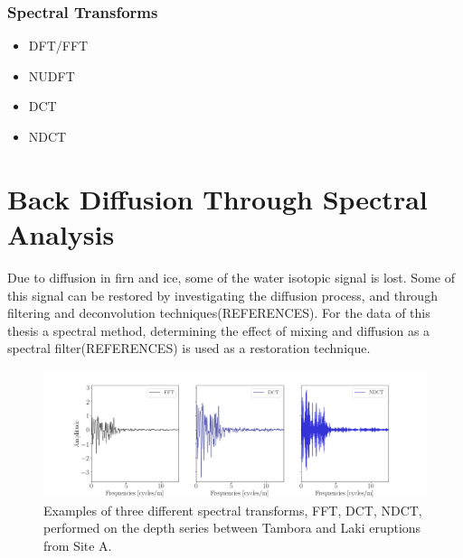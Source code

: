 \documentclass[../../CompleteThesis2/Complete_2ndDraft]{subfiles}
\begin{document}
\subsubsection[Spectral Transforms][Spectral Transforms]{Spectral Transforms}
\label{Subsubsec:SignalAnalysis_BackDiffusion_SpectralAnalysis_SpectralTransforms}

\begin{itemize}
	\item DFT/FFT
	\item NUDFT
	\item DCT
	\item NDCT
\end{itemize}




\section[Back Diffusion][Back Diffusion]{Back Diffusion Through Spectral Analysis}
\label{Sec:SignalAnalysis_BackDiffusion}
Due to diffusion in firn and ice, some of the water isotopic signal is lost. Some of this signal can be restored by investigating the diffusion process, and through filtering and deconvolution techniques(REFERENCES).
For the data of this thesis a spectral method, determining the effect of mixing and diffusion as a spectral filter(REFERENCES) is used as a restoration technique. 
	
	
	


\begin{figure}[h]
	\centering
	\includegraphics[width=\textwidth]{SpectralTransforms_3.png}
	\caption[FFT, DCT, NDCT, Site A]{\small Examples of three different spectral transforms, FFT, DCT, NDCT, performed on the depth series between Tambora and Laki eruptions from Site A.}
	\label{fig:SpectralTransforms_3}
\end{figure}
\end{document}
